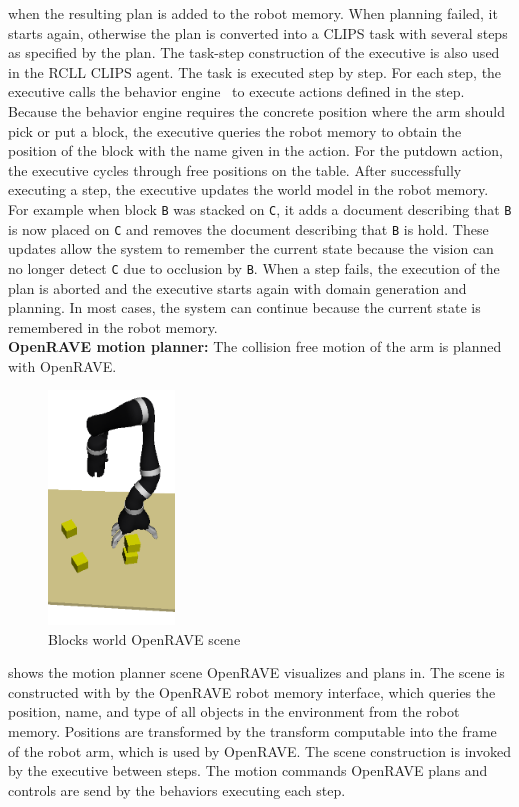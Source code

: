 when the resulting plan is added to the robot memory. When planning
failed, it starts again, otherwise the plan is converted into a CLIPS
task with several steps as specified by the plan. The task-step
construction of the executive is also used in the RCLL CLIPS
agent. The task is executed step by step. For each step, the executive
calls the behavior engine~\cite{Behavior-Engine} to execute actions
defined in the step. Because the behavior engine requires the concrete
position where the arm should pick or put a block, the executive
queries the robot memory to obtain the position of the block with the
name given in the action. For the putdown action, the executive cycles
through free positions on the table. After successfully executing a
step, the executive updates the world model in the robot memory. For
example when block \texttt{B} was stacked on \texttt{C}, it adds a
document describing that \texttt{B} is now placed on \texttt{C} and
removes the document describing that \texttt{B} is hold. These updates
allow the system to remember the current state because the vision can
no longer detect \texttt{C} due to occlusion by \texttt{B}. When a
step fails, the execution of the plan is aborted and the executive
starts again with domain generation and planning. In most cases, the
system can continue because the current state is remembered in the
robot memory.
\\
\textbf{OpenRAVE motion planner:} The collision free motion of the arm
is planned with OpenRAVE.
\begin{figure}
  \centering
  \includegraphics[width=0.3\textwidth]{img/openrave-scene}%
  \caption[Blocks world OpenRAVE scene]{Blocks world OpenRAVE scene}
  \vspace{-4mm}
  \label{fig:openrave}
\end{figure}
 shows the motion planner scene OpenRAVE
visualizes and plans in. The scene is constructed with by the OpenRAVE
robot memory interface, which queries the position, name, and type of
all objects in the environment from the robot memory. Positions are
transformed by the transform computable into the frame of the robot
arm, which is used by OpenRAVE. The scene construction is invoked by
the executive between steps. The motion commands OpenRAVE plans and
controls are send by the behaviors executing each step.
